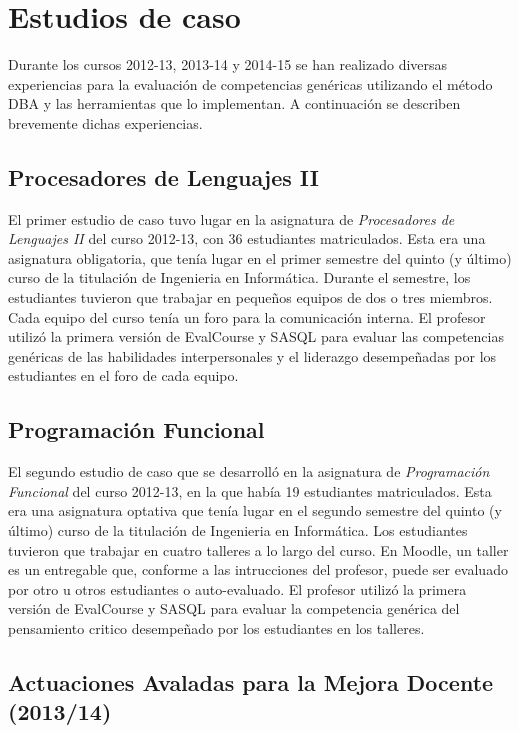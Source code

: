 \section{Estudios de caso}

	Durante los cursos 2012-13, 2013-14 y 2014-15 se han realizado diversas experiencias para la evaluación de competencias genéricas utilizando el método DBA y las herramientas que lo implementan. A continuación se describen brevemente dichas experiencias.

	\subsection{Procesadores de Lenguajes II}

		El primer estudio de caso tuvo lugar en la asignatura de \emph{Procesadores de Lenguajes II} del curso 2012-13, con 36 estudiantes matriculados. Esta era una asignatura obligatoria, que tenía lugar en el primer semestre del quinto (y último) curso de la titulación de Ingenieria en Informática. Durante el semestre, los estudiantes tuvieron que trabajar en pequeños equipos de dos o tres miembros. Cada equipo del curso tenía un foro para la comunicación interna. El profesor utilizó la primera versión de EvalCourse y SASQL para evaluar las competencias genéricas de las habilidades interpersonales y el liderazgo desempeñadas por los estudiantes en el foro de cada equipo.

	\subsection{Programación Funcional}

		El segundo estudio de caso que se desarrolló en la asignatura de \emph{Programación Funcional} del curso 2012-13, en la que había 19 estudiantes matriculados. Esta era una asignatura optativa que tenía lugar en el segundo semestre del quinto (y último) curso de la titulación de Ingenieria en Informática. Los estudiantes tuvieron que trabajar en cuatro talleres a lo largo del curso. En Moodle, un taller es un entregable que, conforme a las intrucciones del profesor, puede ser evaluado por otro u otros estudiantes o auto-evaluado. El profesor utilizó la primera versión de EvalCourse y SASQL para evaluar la competencia genérica del pensamiento critico desempeñado por los estudiantes en los talleres.

	\subsection{Actuaciones Avaladas para la Mejora Docente (2013/14)}


